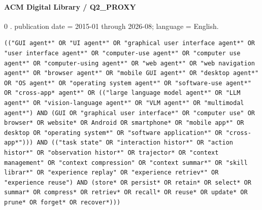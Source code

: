 \noindent\begin{minipage}{\linewidth}
\paragraph{ACM Digital Library / Q2\_PROXY}
0 .
publication date = 2015-01 through 2026-08; language = English.
\begin{lstlisting}
(("GUI agent*" OR "UI agent*" OR "graphical user interface agent*" OR "user interface agent*" OR "computer-use agent*" OR "computer use agent*" OR "computer-using agent*" OR "web agent*" OR "web navigation agent*" OR "browser agent*" OR "mobile GUI agent*" OR "desktop agent*" OR "OS agent*" OR "operating system agent*" OR "software-use agent*" OR "cross-app* agent*" OR (("large language model agent*" OR "LLM agent*" OR "vision-language agent*" OR "VLM agent*" OR "multimodal agent*") AND (GUI OR "graphical user interface*" OR "computer use" OR browser* OR website* OR Android OR smartphone* OR "mobile app*" OR desktop OR "operating system*" OR "software application*" OR "cross-app*"))) AND (("task state" OR "interaction histor*" OR "action histor*" OR "observation histor*" OR trajector* OR "context management" OR "context compression" OR "context summar*" OR "skill librar*" OR "experience replay" OR "experience retriev*" OR "experience reuse") AND (store* OR persist* OR retain* OR select* OR summar* OR compress* OR retriev* OR recall* OR reuse* OR update* OR prune* OR forget* OR recover*)))
\end{lstlisting}
\end{minipage}\par\medskip
